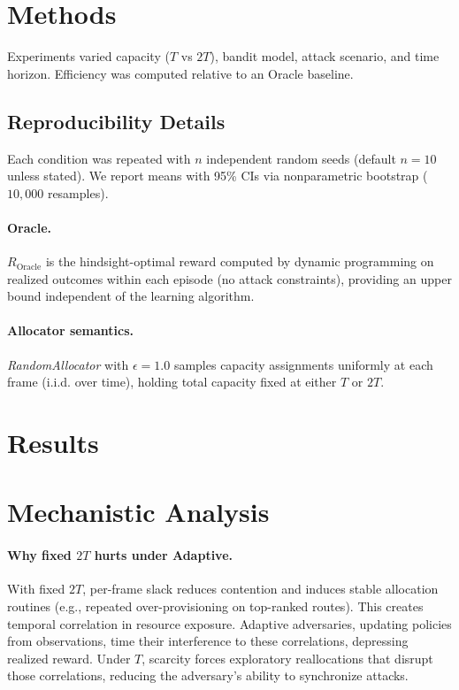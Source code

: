 \documentclass[11pt,a4paper]{article}
\begin{document}
\section{Methods}
Experiments varied capacity ($T$ vs $2T$), bandit model, attack scenario, and time horizon. Efficiency was computed relative to an Oracle baseline.
\subsection{Reproducibility Details}
Each condition was repeated with $n$ independent random seeds (default $n{=}10$ unless stated). We report means with 95\% CIs via nonparametric bootstrap ($10{,}000$ resamples).

\paragraph{Oracle.} $R_{\text{Oracle}}$ is the hindsight-optimal reward computed by dynamic programming on realized outcomes within each episode (no attack constraints), providing an upper bound independent of the learning algorithm.

\paragraph{Allocator semantics.} \textit{RandomAllocator} with $\epsilon{=}1.0$ samples capacity assignments uniformly at each frame (i.i.d. over time), holding total capacity fixed at either $T$ or $2T$.

\section{Results}

\section{Mechanistic Analysis}
\paragraph{Why fixed $2T$ hurts under Adaptive.}
With fixed $2T$, per-frame slack reduces contention and induces stable allocation routines (e.g., repeated over-provisioning on top-ranked routes). This creates temporal correlation in resource exposure. Adaptive adversaries, updating policies from observations, time their interference to these correlations, depressing realized reward. Under $T$, scarcity forces exploratory reallocations that disrupt those correlations, reducing the adversary’s ability to synchronize attacks.
\end{document}
